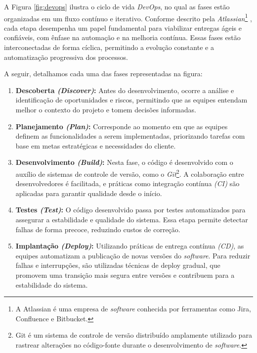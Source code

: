 A Figura \ref{fig:devops} ilustra o ciclo de vida \textit{DevOps}, no qual as fases estão organizadas em um fluxo contínuo e iterativo. Conforme descrito pela \textit{Atlassian}\footnote{A Atlassian é uma empresa de \textit{software} conhecida por ferramentas como Jira, Confluence e Bitbucket.} \cite{Atlassian2025}, cada etapa desempenha um papel fundamental para viabilizar entregas ágeis e confiáveis, com ênfase na automação e na melhoria contínua. Essas fases estão interconectadas de forma cíclica, permitindo a evolução constante e a automatização progressiva dos processos.

A seguir, detalhamos cada uma das fases representadas na figura:

\begin{enumerate} 

\item \textbf{Descoberta \textit{(Discover)}:} Antes do desenvolvimento, ocorre a análise e identificação de oportunidades e riscos, permitindo que as equipes entendam melhor o contexto do projeto e tomem decisões informadas.

\item \textbf{Planejamento \textit{(Plan)}:} Corresponde ao momento em que as equipes definem as funcionalidades a serem implementadas, priorizando tarefas com base em metas estratégicas e necessidades do cliente.

\item \textbf{Desenvolvimento \textit{(Build)}:} Nesta fase, o código é desenvolvido com o auxílio de sistemas de controle de versão, como o \textit{Git}\footnote{Git é um sistema de controle de versão distribuído amplamente utilizado para rastrear alterações no código-fonte durante o desenvolvimento de \textit{software}.}. A colaboração entre desenvolvedores é facilitada, e práticas como integração contínua \textit{(CI)} são aplicadas para garantir qualidade desde o início.

\item \textbf{Testes \textit{(Test)}:} O código desenvolvido passa por testes automatizados para assegurar a estabilidade e qualidade do sistema. Essa etapa permite detectar falhas de forma precoce, reduzindo custos de correção.

\item \textbf{Implantação \textit{(Deploy)}:} Utilizando práticas de entrega contínua \textit{(CD)}, as equipes automatizam a publicação de novas versões do \textit{software}. Para reduzir falhas e interrupções, são utilizadas técnicas de deploy gradual, que promovem uma transição mais segura entre versões e contribuem para a estabilidade do sistema.


\end{enumerate}
